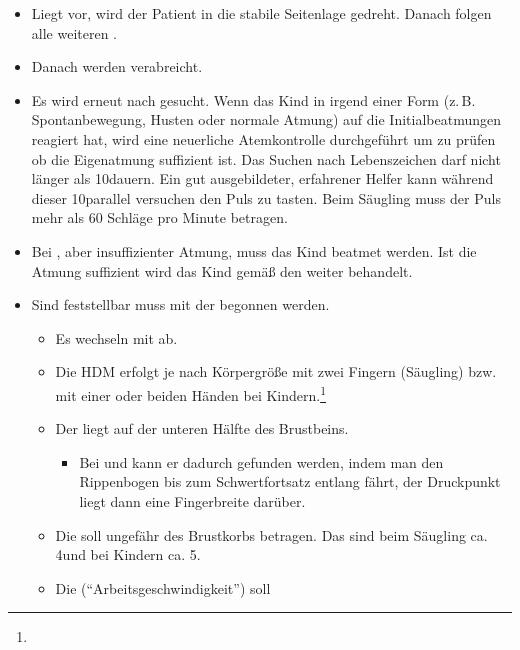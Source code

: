{\begin{itemize}
  BLS
  \item Liegt  vor, wird der Patient in
  die stabile Seitenlage gedreht. Danach folgen alle
  weiteren {\TxMassVit}.
  \item Danach werden  verabreicht.
  \item Es wird erneut nach  gesucht. Wenn
  das Kind in irgend einer Form (z.\,B.
  Spontanbewegung, Husten oder normale Atmung)
  auf die Initialbeatmungen reagiert hat, wird eine
  neuerliche Atemkontrolle durchgeführt um zu prüfen ob die
  Eigenatmung suffizient ist. Das Suchen nach Lebenszeichen
  darf nicht länger als 10\Sec* dauern. Ein gut
  ausgebildeter, erfahrener Helfer kann während dieser
  10\Sec* parallel versuchen den Puls zu tasten. Beim
  Säugling muss der Puls mehr als 60 Schläge pro Minute
  betragen.
  \item Bei , aber
  insuffizienter Atmung, muss das Kind beatmet werden. Ist
  die Atmung suffizient wird das Kind gemäß den {\TxMassVit}
  weiter behandelt.
  \item
  Sind  feststellbar muss mit der
   begonnen werden.
  \begin{itemize}
    \item Es
    wechseln  mit  ab.
    \item
    Die HDM
    erfolgt je nach Körpergröße mit zwei Fingern (Säugling)
    bzw. mit einer oder beiden Händen bei
    Kindern.\footnote{}
    \item
    Der  liegt auf der unteren Hälfte des Brustbeins. 
    \begin{itemize}
      \item Bei  und  kann er dadurch
      gefunden werden, indem man den Rippenbogen bis zum Schwertfortsatz
      entlang fährt, der Druckpunkt liegt dann eine Fingerbreite darüber.
    \end{itemize}
    \item
    Die
     soll ungefähr  des
    Brustkorbs betragen. Das sind beim Säugling ca. 4\CM* und
    bei Kindern ca. 5\CM* \cite{Erc2010Sek06De}.
    \item
    Die 
    (\enquote{Arbeitsgeschwindigkeit}) soll

\end{itemize}
\end{itemize}}
